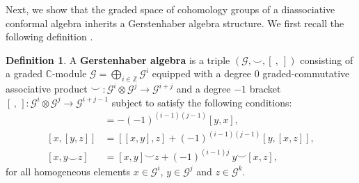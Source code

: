 \documentclass[a4paper,reqno,10pt]{amsart}
\theoremstyle{plain}
\theoremstyle{definition}
\newtheorem{definition}[thm]{Definition}
\theoremstyle{remark}
\newcommand{\C}{\mathbb{C}}
\newcommand{\GG}{\mathcal{G}}
\begin{document}
\medskip

Next, we show that the graded space of cohomology groups of a diassociative conformal algebra inherits a Gerstenhaber algebra structure. We first recall the following definition \cite{gers-voro,Hou-Shen-Zhao}.

\begin{definition}
A \textbf{Gerstenhaber algebra} is a triple $(\GG, \smile , [~, ~ ])$ consisting of a graded $\C$-module $\GG=\bigoplus \limits_{i\in\mathbb{Z}}\GG^{i}$ equipped with a degree $0$ graded-commutative associative product $\smile ~ \! :\GG^{i}\otimes\GG^{j}\rightarrow\GG^{i+j}$ and a degree $-1$ bracket $[\, ,\, ]:\GG^{i}\otimes\GG^{j}\rightarrow\GG^{i+j-1}$ subject to satisfy the following conditions:
\begin{align}
[x,y] &= -(-1)^{(i-1)(j-1)}[y,x],\\
[x,[y,z]] &= [[x,y],z]+(-1)^{(i-1)(j-1)}[y,[x,z]],\\
[x,y\smile z] &= [x,y]\smile z+(-1)^{(i-1)j} ~ \! y\smile[x,z], \label{leibn-rule}
\end{align}
for all homogeneous elements $x\in\GG^{i}$, $y\in\GG^{j}$ and $z\in\GG^{k}$.
\end{definition}
\end{document}

